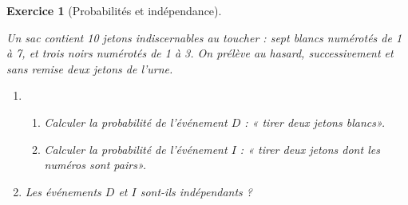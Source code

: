 \documentclass[12pt,a4paper]{article}
\theoremstyle{break}
\theoremstyle{nobreak}
\newtheorem{exercice}{Exercice}
\theoremstyle{nonumberplain}
\begin{document}
\begin{exercice}[Probabilités et indépendance]~

  Un sac contient 10 jetons indiscernables au toucher : sept blancs
  numérotés de 1 à 7, et trois noirs numérotés de 1 à 3. On prélève au
  hasard, successivement et sans remise deux jetons de l'urne.
  \begin{enumerate}
    \item \begin{enumerate}
        \item Calculer la probabilité de l'événement $D$ : « tirer deux
          jetons blancs».
        \item Calculer la probabilité de l'événement $I$ : « tirer deux
          jetons dont les numéros sont pairs».
      \end{enumerate}
    \item Les événements $D$ et $I$ sont-ils indépendants ?
  \end{enumerate}
\end{exercice}
\end{document}
